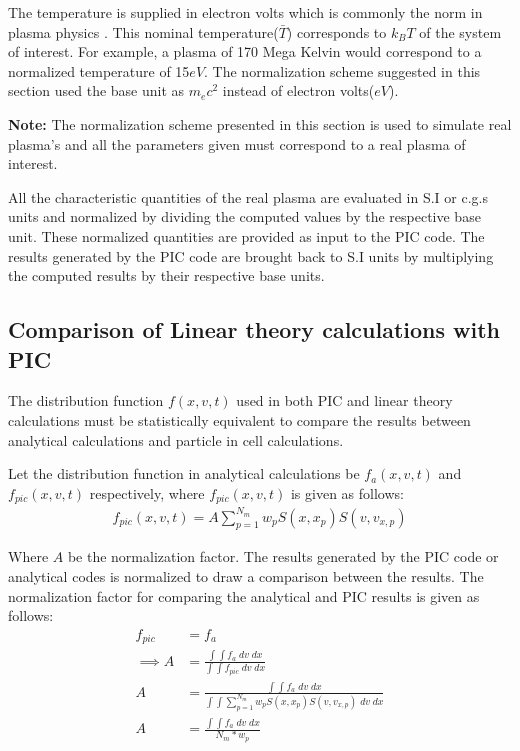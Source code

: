 \documentclass{article}
\begin{document}
The temperature is supplied in electron volts which is commonly the norm in plasma physics \cite{9}. This nominal temperature($\bar{T}$) corresponds to $k_{B}T$ of the system of interest. For example, a plasma of 170 Mega Kelvin would correspond to a normalized temperature of 15$eV$. The normalization scheme suggested in this section used the base unit as $m_{e}c^{2}$ instead of electron volts($eV$). 

\textbf{Note:} The normalization scheme presented in this section is used to simulate real plasma's and all the parameters given must correspond to a real plasma of interest. 

All the characteristic quantities of the real plasma are evaluated in S.I or c.g.s units and normalized by dividing the computed values by the respective base unit. These normalized quantities are provided as input to the PIC code. The results generated by the PIC code are brought back to S.I units by multiplying the computed results by their respective base units.

\subsection*{Comparison of Linear theory calculations with PIC}

The distribution function $f(x, v, t)$ used in both PIC and linear theory calculations must be statistically equivalent to compare the results between analytical calculations and particle in cell calculations. 

Let the distribution function in analytical calculations be $f_{a}(x, v, t)$ and $f_{pic}(x, v, t)$ respectively, where $f_{pic}(x, v, t)$ is given as follows:
\begin{align}
f_{pic}(x, v, t) = A\sum_{p=1}^{N_{m}} w_{p}S(x, x_{p})S(v, v_{x,p})
\end{align}

Where $A$ be the normalization factor. The results generated by the PIC code or analytical codes is normalized to draw a comparison between the results. The normalization factor for comparing the analytical and PIC results is given as follows:
\begin{align}
f_{pic} &= f_{a}  \\
\implies A &= \frac{\int \int f_{a}\;dv\;dx}{\int \int f_{pic}\;dv\;dx}  \\
A &= \frac{\int \int f_{a}\;dv\;dx}{\int \int\sum_{p=1}^{N_{m}} w_{p}S(x, x_{p})S(v, v_{x,p})\;dv\;dx} \\
A &= \frac{\int \int f_{a}\;dv\;dx}{N_{m} * w_{p}}
\end{align}
\end{document}
